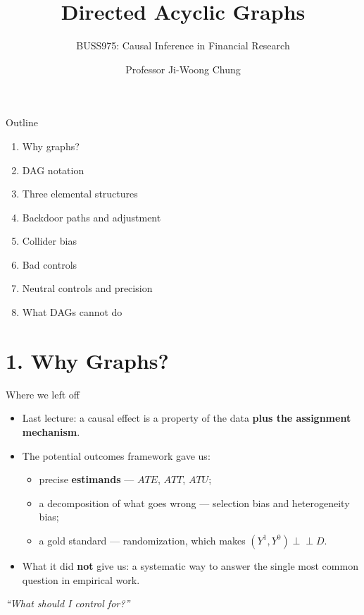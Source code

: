\documentclass[
  11pt,
  ignorenonframetext,
  aspectratio=169,
]{beamer}
\title{\texorpdfstring{Directed Acyclic
Graphs}{Directed Acyclic Graphs}}
\subtitle{\texorpdfstring{BUSS975: Causal Inference in Financial
Research}{BUSS975: Causal Inference in Financial Research}}
\author{Professor Ji-Woong Chung}
\date{}
\institute{Korea University}
\providecommand{\tightlist}{%
  \setlength{\itemsep}{0pt}\setlength{\parskip}{0pt}}
\newcommand{\indep}{\perp\!\!\!\perp}
\begin{document}
\frame{\titlepage}


\begin{frame}{Outline}
\protect{}\label{outline}
\begin{enumerate}
\tightlist
\item
  Why graphs?
\item
  DAG notation
\item
  Three elemental structures
\item
  Backdoor paths and adjustment
\item
  Collider bias
\item
  Bad controls
\item
  Neutral controls and precision
\item
  What DAGs cannot do
\end{enumerate}
\end{frame}

\section{1. Why Graphs?}\label{why-graphs}

\begin{frame}{Where we left off}
\protect{}\label{where-we-left-off}
\begin{itemize}
\tightlist
\item
  Last lecture: a causal effect is a property of the data \textbf{plus
  the assignment mechanism}.
\item
  The potential outcomes framework gave us:

  \begin{itemize}
  \tightlist
  \item
    precise \textbf{estimands} --- \(ATE\), \(ATT\), \(ATU\);
  \item
    a decomposition of what goes wrong --- selection bias and
    heterogeneity bias;
  \item
    a gold standard --- randomization, which makes
    \((Y^1,Y^0) \indep D\).
  \end{itemize}
\item
  What it did \textbf{not} give us: a systematic way to answer the
  single most common question in empirical work.
\end{itemize}

\begin{center}
\emph{``What should I control for?''}
\end{center}
\end{frame}
\end{document}
